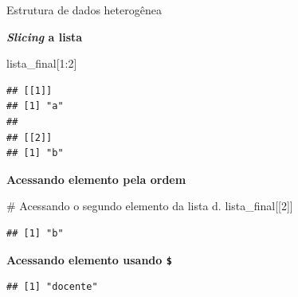 \documentclass[
  10pt,
  ignorenonframetext,
]{beamer}
\newenvironment{Shaded}{}{}
\newcommand{\CommentTok}[1]{\textcolor[rgb]{0.00,0.50,0.00}{#1}}
\newcommand{\DataTypeTok}[1]{#1}
\newcommand{\DecValTok}[1]{#1}
\newcommand{\KeywordTok}[1]{\textcolor[rgb]{0.00,0.00,1.00}{#1}}
\newcommand{\NormalTok}[1]{#1}
\newcommand{\OperatorTok}[1]{#1}
\newcommand{\StringTok}[1]{\textcolor[rgb]{0.00,0.50,0.50}{#1}}
\begin{document}
\begin{frame}[fragile]{Estrutura de dados heterogênea}
\protect\hypertarget{estrutura-de-dados-heteroguxeanea-4}{}
\small

\textbf{\emph{Slicing} a lista}

\begin{Shaded}
\begin{Highlighting}[]
\NormalTok{lista\_final[}\DecValTok{1}\OperatorTok{:}\DecValTok{2}\NormalTok{]}
\end{Highlighting}
\end{Shaded}

\begin{verbatim}
## [[1]]
## [1] "a"
## 
## [[2]]
## [1] "b"
\end{verbatim}

\textbf{Acessando elemento pela ordem}

\begin{Shaded}
\begin{Highlighting}[]
\CommentTok{\# Acessando o segundo elemento da lista d.}
\NormalTok{lista\_final[[}\DecValTok{2}\NormalTok{]]}
\end{Highlighting}
\end{Shaded}

\begin{verbatim}
## [1] "b"
\end{verbatim}

\textbf{Acessando elemento usando \texttt{\$}}

\begin{Shaded}
\end{Shaded}

\begin{verbatim}
## [1] "docente"
\end{verbatim}

\normalsize
\end{frame}
\end{document}
